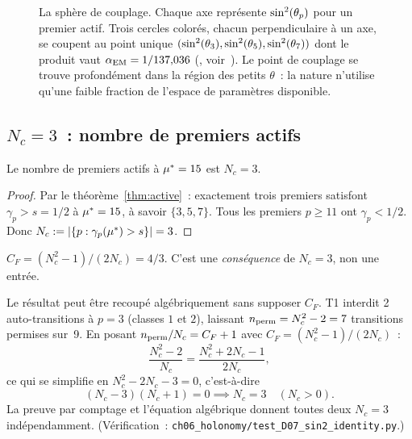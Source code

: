 \documentclass[12pt,a4paper]{article}
\begin{document}
\begin{figure}[htbp]
\caption{La sphère de couplage.
  Chaque axe représente $\sin^2(\theta_{p})$ pour un premier actif.
  Trois cercles colorés, chacun perpendiculaire à un axe, se coupent
  au point unique $(\sin^2(\theta_{3}), \sin^2(\theta_{5}), \sin^2(\theta_{7}))$ dont le produit
  vaut $\alpha_{\mathrm{EM}} = 1/137{,}036$ (\BRIDGETAG, voir~\cite{companion_M5}).
  Le point de couplage se trouve profondément dans la région des
  petits $\theta$~: la nature n'utilise qu'une faible fraction de
  l'espace de paramètres disponible.}
\label{fig:coupling_cube}
\end{figure}

\subsection{$N_c = 3$~: nombre de premiers actifs}
\label{sec:Nc_3}

\mTHM
\begin{theoreme}[$N_c = 3$]
\label{thm:Nc_3}
Le nombre de premiers actifs à ${\mu^{*}} = 15$ est $N_c = 3$.

\begin{proof}
Par le théorème~\ref{thm:active}~: exactement trois premiers
satisfont $\gamma_p > s = 1/2$ à ${\mu^{*}} = 15$, à savoir
$\{3, 5, 7\}$. Tous les premiers $p \geq 11$ ont
$\gamma_p < 1/2$. Donc
$N_c := |\{p : \gamma_p({\mu^{*}}) > s\}| = 3$.
\end{proof}
\end{theoreme}

\begin{corollaire}
\label{cor:CF}
$C_F = (N_c^2 - 1)/(2N_c) = 4/3$.
C'est une \emph{conséquence} de $N_c = 3$, non une entrée.
\end{corollaire}

\begin{remarque}
\label{rem:Nc_algebraic}
Le résultat peut être recoupé algébriquement sans supposer $C_F$.
T1 interdit 2 auto-transitions à $p = 3$ (classes $1$ et $2$),
laissant $n_{\rm perm} = N_c^2 - 2 = 7$ transitions permises sur~9.
En posant $n_{\rm perm}/N_c = C_F + 1$ avec
$C_F = (N_c^2 - 1)/(2N_c)$~:
\[
  \frac{N_c^2 - 2}{N_c} = \frac{N_c^2 + 2N_c - 1}{2N_c},
\]
ce qui se simplifie en $N_c^2 - 2N_c - 3 = 0$, c'est-à-dire
\begin{equation}
  (N_c - 3)(N_c + 1) = 0 \implies N_c = 3 \quad (N_c > 0).
  \label{eq:Nc_equation}
\end{equation}
La preuve par comptage et l'équation algébrique donnent toutes deux
$N_c = 3$ indépendamment. (Vérification~:
\texttt{ch06\_holonomy/test\_D07\_sin2\_identity.py}.)
\end{remarque}
\end{document}
